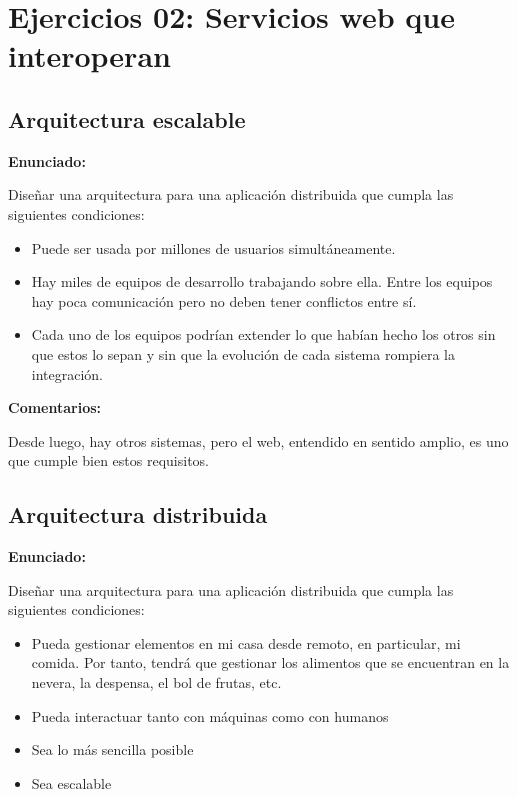 \section{Ejercicios 02: Servicios web que interoperan}


\subsection{Arquitectura escalable}
\label{subsec:arq-escalable}

\textbf{Enunciado:}

Diseñar una arquitectura para una aplicación distribuida que cumpla las siguientes condiciones:

\begin{itemize}
\item Puede ser usada por millones de usuarios simultáneamente.
\item Hay miles de equipos de desarrollo trabajando sobre ella. Entre los equipos hay poca comunicación pero no deben tener conflictos entre sí.
\item Cada uno de los equipos podrían extender lo que habían hecho los otros sin que estos lo sepan y sin que la evolución de cada sistema rompiera la integración.
\end{itemize}

\textbf{Comentarios:}

Desde luego, hay otros sistemas, pero el web, entendido en sentido amplio, es uno que cumple bien estos requisitos.


\subsection{Arquitectura distribuida}
\label{subsec:arq-distribuida}

\textbf{Enunciado:}

Diseñar una arquitectura para una aplicación distribuida que cumpla las siguientes condiciones:

\begin{itemize}
\item Pueda gestionar elementos en mi casa desde remoto, en particular, mi comida. Por tanto, tendrá que gestionar los alimentos que se encuentran en la nevera, la despensa, el bol de frutas, etc.
\item Pueda interactuar tanto con máquinas como con humanos
\item Sea lo más sencilla posible
\item Sea escalable
\end{itemize}


